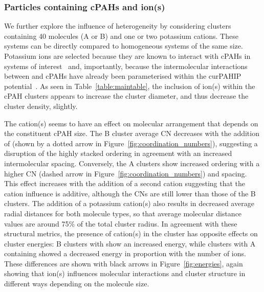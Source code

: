 \subsubsection{Particles containing cPAHs and ion(s)} 


We further explore the influence of heterogeneity by considering clusters containing 40 molecules (A or B) and one or two potassium cations.  These systems can be directly compared to homogeneous systems of the same size. Potassium ions are selected because they are known to interact with cPAHs in systems of interest~\cite{Simonsson2017} and, importantly, because the intermolecular interactions between  and cPAHs have already been parameterised within the curPAHIP potential~\cite{bowal2019ion}. As seen in Table~\ref{table:maintable}, the inclusion of ion(s) within the cPAH clusters appears to increase the cluster diameter, and thus decrease the cluster density, slightly.

The cation(s) seems to have an effect on molecular arrangement that depends on the constituent cPAH size. The B cluster average CN decreases with the addition of  (shown by a dotted arrow in Figure~\ref{fig:coordination_numbers}), suggesting a disruption of the highly stacked ordering in agreement with an increased intermolecular spacing. Conversely, the A clusters show increased ordering with a higher CN (dashed arrow in Figure~\ref{fig:coordination_numbers}) and spacing. This effect increases with the addition of a second cation suggesting that the cation influence is additive, although the CNs are still lower than those of the B clusters. %
The addition of a potassium cation(s) also results in decreased average radial distances for both molecule types, so that average molecular distance values are around 75\% of the total cluster radius.
In agreement with these structural metrics, the presence of cation(s) in the cluster has opposite effects on cluster energies: B clusters with  show an increased energy, while clusters with A containing  showed a decreased energy in proportion with the number of ions.  These differences are shown with black arrows in Figure~\ref{fig:energies}, again showing that ion(s) influences molecular interactions and cluster structure in different ways depending on the molecule size.

